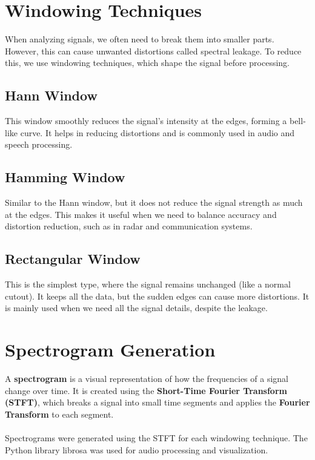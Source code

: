 \documentclass[a4paper,12pt]{article}
\begin{document}
\section{Windowing Techniques}
When analyzing signals, we often need to break them into smaller parts. However, this can cause unwanted distortions called spectral leakage. To reduce this, we use windowing techniques, which shape the signal before processing. 
\subsection{Hann Window}
This window smoothly reduces the signal's intensity at the edges, forming a bell-like curve. It helps in reducing distortions and is commonly used in audio and speech processing.
\subsection{Hamming Window}
Similar to the Hann window, but it does not reduce the signal strength as much at the edges. This makes it useful when we need to balance accuracy and distortion reduction, such as in radar and communication systems.
\subsection{Rectangular Window}
This is the simplest type, where the signal remains unchanged (like a normal cutout). It keeps all the data, but the sudden edges can cause more distortions. It is mainly used when we need all the signal details, despite the leakage.

\newpage
\section{Spectrogram Generation}
A \textbf{spectrogram} is a visual representation of how the frequencies of a signal change over time. It is created using the \textbf{Short-Time Fourier Transform (STFT)}, which breaks a signal into small time segments and applies the \textbf{Fourier Transform} to each segment.
\paragraph{}
Spectrograms were generated using the STFT for each windowing technique. The Python library librosa was used for audio processing and visualization. 
\end{document}
